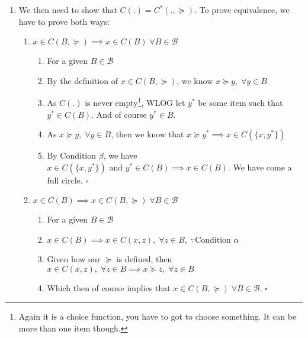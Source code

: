 \documentclass{tufte-handout}
\begin{document}
\begin{enumerate}
    \item We then need to show that $C(.) = C^{*}(., \succcurlyeq)$. To prove equivalence, we have to prove both ways:
    \begin{enumerate}
    
        \item $x \in C(B, \succcurlyeq) \implies x \in C(B) \; \forall B \in \mathscr{B}$
        
        \begin{enumerate}
            
            \item For a given $B \in \mathscr{B}$
        
            \item By the definition of $x \in C(B, \succcurlyeq)$, we know $x \succcurlyeq y, \; \forall y \in B$
            
            \item As $C(.)$ is never empty\footnote{Again it is a choice function, you have to got to choose something. It can be more than one item though.}, WLOG let $y^{*}$ be some item such that $y^{*} \in C(B)$. And of course $y^{*} \in B$.
            
            \item As $x \succcurlyeq y, \; \forall y \in B$, then we know that $x \succcurlyeq y^{*} \implies x \in C(\{x, y^{*}\})$
            
            \item By Condition $\beta$, we have $x \in C(\{x, y^{*}\}) \text{ and } y^{*} \in C(B) \implies x \in C(B)$. We have come a full circle. $\square$
            
        \end{enumerate}
    
        \item $x \in C(B) \implies x \in C(B, \succcurlyeq) \; \forall B \in \mathscr{B}$
        
        \begin{enumerate}
            
            \item For a given $B \in \mathscr{B}$
            
            \item $x \in C(B) \implies x \in C({x, z}), \; \forall z \in B, \; \because \text{Condition } \alpha$ 
            
            \item Given how our $\succcurlyeq$ is defined, then $x \in C({x, z}), \; \forall z \in B \implies x \succcurlyeq z, \; \forall z \in B$ 
            
            \item Which then of course implies that $x \in C(B, \succcurlyeq) \; \forall B \in \mathscr{B}$. $\square$ 
            
        \end{enumerate}
            
    \end{enumerate}

\end{enumerate}

%
%
\end{document}
